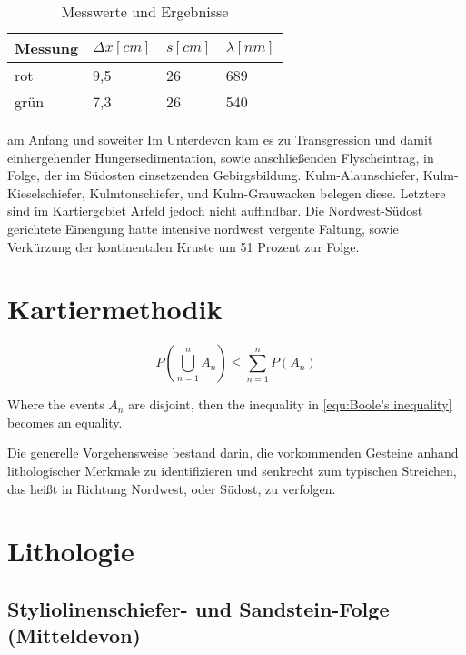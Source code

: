 \cite{Gerth06,kroner07,schwartz08,Brown09,IngGeo11,PhyPro11}

\begin{table}[!h]
\centering
\caption{Messwerte und Ergebnisse}
\label{tab:Laser}
\begin{tabular}{@{}llll@{}}
\toprule
{Messung} & {$\Delta x[cm]$} & {$s[cm]$} & {$\lambda[nm]$} \\ \midrule
rot     & 9,5           & 26    & 689          \\
grün    & 7,3         & 26    & 540          \\ \bottomrule
\end{tabular}
\end{table}

 am Anfang und soweiter Im Unterdevon kam es zu Transgression und damit einhergehender Hungersedimentation, sowie anschließenden Flyscheintrag, in Folge, der im Südosten einsetzenden Gebirgsbildung. Kulm-Alaunschiefer, Kulm-Kieselschiefer, Kulmtonschiefer, und Kulm-Grauwacken belegen diese. Letztere sind im Kartiergebiet Arfeld jedoch nicht auffindbar. Die Nordwest-Südost gerichtete Einengung hatte intensive nordwest vergente Faltung, sowie Verkürzung der kontinentalen Kruste um 51 Prozent zur Folge. 

\section{Kartiermethodik}

\begin{equation}
P(\bigcup_{n=1}^n A_n) \leq \sum_{n=1}^n P(A_n)
\label{equ:Boole's inequality}
\end{equation}

Where the events $A_n$ are disjoint, then the inequality 
in \autoref{equ:Boole's inequality} becomes an equality.

Die generelle Vorgehensweise bestand darin, die vorkommenden Gesteine anhand lithologischer Merkmale zu identifizieren und senkrecht zum typischen Streichen, das heißt in Richtung Nordwest, oder Südost, zu verfolgen.

\section{Lithologie}

\subsection{Styliolinenschiefer- und Sandstein-Folge (Mitteldevon)}

